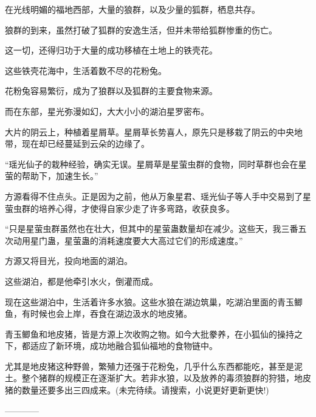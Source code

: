 \begin{this_body}
在光线明媚的福地西部，大量的狼群，以及少量的狐群，栖息共存。

狼群的到来，虽然打破了狐群的安逸生活，但并未带给狐群惨重的伤亡。

这一切，还得归功于大量的成功移植在土地上的铁壳花。

这些铁壳花海中，生活着数不尽的花粉兔。

花粉兔容易繁衍，成为了狼群以及狐群的主要食物来源。

而在东部，星光弥漫如幻，大大小小的湖泊星罗密布。

大片的阴云上，种植着星屑草。星屑草长势喜人，原先只是移栽了阴云的中央地带，现在却已经蔓延到云朵的边缘了。

“瑶光仙子的栽种经验，确实无误。星屑草是星萤虫群的食物，同时草群也会在星萤的帮助下，加速生长。”

方源看得不住点头。正是因为之前，他从万象星君、瑶光仙子等人手中交易到了星萤虫群的培养心得，才使得自家少走了许多弯路，收获良多。

“只是星萤虫群虽然也在壮大，但其中的星萤蛊数量却在减少。这些天，我三番五次动用星门蛊，星萤蛊的消耗速度要大大高过它们的形成速度。”

方源又将目光，投向地面的湖泊。

这些湖泊，都是他牵引水火，倒灌而成。

现在这些湖泊中，生活着许多水狼。这些水狼在湖边筑巢，吃湖泊里面的青玉鲫鱼，有时候也会上岸，吞食在湖边汲水的地皮猪。

青玉鲫鱼和地皮猪，皆是方源上次收购之物。如今大批豢养，在小狐仙的操持之下，都适应了新环境，成功地融合狐仙福地的食物链中。

尤其是地皮猪这种野兽，繁殖力还强于花粉兔，几乎什么东西都能吃，甚至是泥土。整个猪群的规模正在逐渐扩大。若非水狼，以及放养的毒须狼群的狩猎，地皮猪的数量还要多出三四成来。(未完待续。请搜索，小说更好更新更快!)

------------

\end{this_body}


